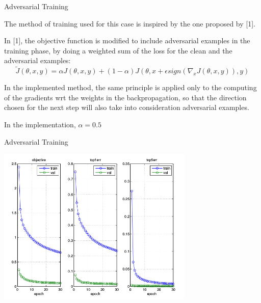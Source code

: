 \begin{tframe}{Adversarial Training}

The method of training used for this case is inspired by the one proposed by [1].

\vspace{0.1in}

In [1], the objective function is modified to include adversarial examples in the training phase, by doing a weighted sum of the loss for the clean and the adversarial examples:
$$ 	\tilde{J}(\theta, x, y) = \alpha J(\theta, x, y) + ( 1 - \alpha)J(\theta, x + \epsilon sign(\nabla_{x}J(\theta, x, y)), y) $$

\vspace{0.1in}

In the implemented method, the same principle is applied only to the computing of the gradients wrt the weights in the backpropagation, so that the direction chosen for the next step will also take into consideration adversarial examples. 

\vspace{0.1in}

In the implementation, $ \alpha = 0.5 $

\end{tframe}

\begin{tframe}{Adversarial Training}

\begin{center}
  \includegraphics[width=0.7\textwidth]{img/train-adv.png}
	\label{train-mix} 
\end{center}

\end{tframe}

